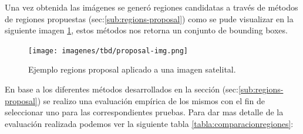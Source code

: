 
Una vez obtenida las imágenes se generó regiones candidatas a través de métodos de regiones propuestas (sec:\ref{sub:regions-proposal}) como se pude visualizar en la siguiente imagen \ref{Fig:rp-ejemplo}, estos métodos nos retorna  un conjunto de bounding boxes.

\begin{figure}[H] \centering
  \texttt{[image: imagenes/tbd/proposal-img.png]}
  \caption{Ejemplo regions proposal aplicado a una imagen satelital.}\label{Fig:rp-ejemplo}
\end{figure}

En base a los diferentes métodos desarrollados en la sección (sec:\ref{sub:regions-proposal}) se realizo una evaluación empírica de los mismos con el fin de seleccionar uno para las correspondientes pruebas. Para dar mas detalle de la evaluación realizada podemos ver la siguiente tabla \ref{tabla:comparacionregiones}:

